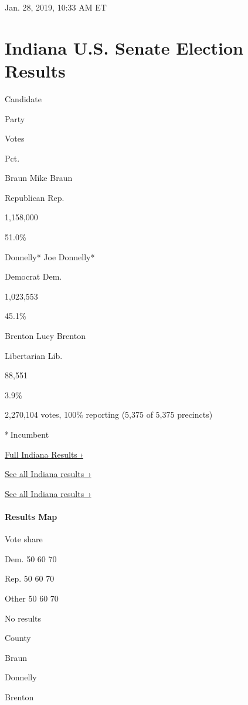 Jan. 28, 2019, 10:33 AM ET

\hypertarget{indiana-us-senate-election-results}{%
\section{Indiana U.S. Senate Election
Results}\label{indiana-us-senate-election-results}}

Candidate

Party

Votes

Pct.

 Braun Mike Braun

Republican Rep.

1,158,000

51.0\%

 Donnelly* Joe Donnelly*

Democrat Dem.

1,023,553

45.1\%

 Brenton Lucy Brenton

Libertarian Lib.

88,551

3.9\%

2,270,104 votes, 100\% reporting (5,375 of 5,375 precincts)

* Incumbent

\href{https://www.nytimes.com/interactive/2018/11/06/us/elections/results-indiana-elections.html}{Full
Indiana Results ›}

\href{https://www.nytimes.com/interactive/2018/11/06/us/elections/results-indiana-elections.html}{See
all Indiana results~›}

\href{https://www.nytimes.com/interactive/2018/11/06/us/elections/results-indiana-elections.html}{See
all Indiana results~›}

\hypertarget{results-map}{%
\paragraph{Results Map}\label{results-map}}

Vote share

Dem. 50 60 70

Rep. 50 60 70

Other 50 60 70

No results

County

Braun

Donnelly

Brenton

